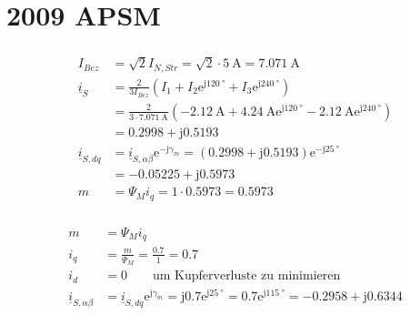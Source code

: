\documentclass[11pt,a4paper]{scrartcl}
\newcommand{\mybr}[1]{\left(#1\right)}
\renewcommand{\j}{\mathrm{j}}
\renewcommand{\i}{\underline{i}}
\newcommand{\0}{_{\mybr{0}}}
\newcommand{\1}{_{\mybr{1}}}
\newcommand{\2}{_{\mybr{2}}}
\renewcommand{\e}{\mathrm{e}}
\newcommand{\isab}{\i_{S,\alpha\beta}}
\newcommand{\isdq}{\i_{S,dq}}
\begin{document}
\part{2009 APSM}
\section{}
\begin{align}
I_{Bez}&=\sqrt{2}I_{N,Str}=\sqrt{2}\cdot\SI{5}{\ampere}=\SI{7.071}{\ampere}\\
\i_S&=\frac{2}{3I_{Bez}}\mybr{I_1+I_2\e^{\j\SI{120}{\degree}}+I_3\e^{\j\SI{240}{\degree}}}\\
&=\frac{2}{3\cdot\SI{7.071}{\ampere}}\mybr{\SI{-2.12}{\ampere}+\SI{4.24}{\ampere}\e^{\j\SI{120}{\degree}}-\SI{2.12}{\ampere}\e^{\j\SI{240}{\degree}}}\\
&=\num{0.2998}+\j\num{0.5193}\\
\isdq&=\isab\e^{-\j\gamma_m}=\mybr{\num{0.2998}+\j\num{0.5193}}\e^{-\j\SI{25}{\degree}}\\
&=\num{-0.05225}+\j\num{0.5973}\\
m&=\Psi_M i_q=1\cdot\num{0.5973}=\num{0.5973}
\end{align}

\section{}
\begin{align}
m&=\Psi_M i_q\\
i_q&=\frac{m}{\Psi_M}=\frac{\num{0.7}}{1}=\num{0.7}\\
i_d&=0\quad\quad\text{um Kupferverluste zu minimieren}\\
\isab&=\isdq\e^{\j\gamma_m}=\j\num{0.7}\e^{\j\SI{25}{\degree}}=\num{0.7}\e^{\j\SI{115}{\degree}}=\num{-0.2958}+\j\num{0.6344}
\end{align}
\end{document}
